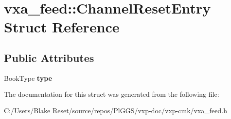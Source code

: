 \hypertarget{structvxa__feed_1_1_channel_reset_entry}{}\section{vxa\+\_\+feed\+::Channel\+Reset\+Entry Struct Reference}
\label{structvxa__feed_1_1_channel_reset_entry}
\subsection*{Public Attributes}
\begin{DoxyCompactItemize}
\item 
\mbox{\label{structvxa__feed_1_1_channel_reset_entry_a7ff2e789c4cbb9617d8dcaa4b916b743}} 
Book\+Type {\bfseries type}
\end{DoxyCompactItemize}


The documentation for this struct was generated from the following file\+:\begin{DoxyCompactItemize}
\item 
C\+:/\+Users/\+Blake Reset/source/repos/\+Pl\+G\+G\+S/vxp-\/doc/vxp-\/cmk/vxa\+\_\+feed.\+h\end{DoxyCompactItemize}
